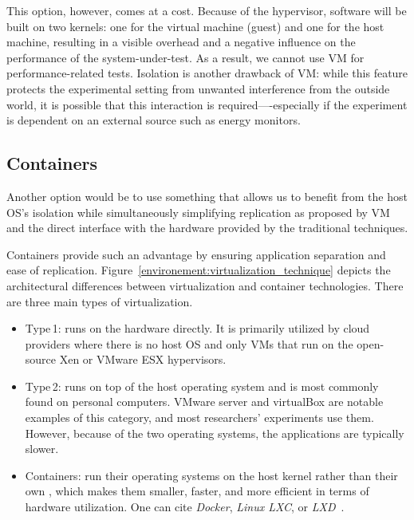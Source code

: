 This option, however, comes at a cost. Because of the hypervisor, software will be built on two kernels: one for the virtual machine (guest) and one for the host machine, resulting in a visible overhead and a negative influence on the performance of the system-under-test.
As a result, we cannot use VM for performance-related tests.
Isolation is another drawback of VM: while this feature protects the experimental setting from unwanted interference from the outside world, it is possible that this interaction is required—-especially if the experiment is dependent on an external source such as energy monitors.

\subsection{Containers}
Another option would be to use something that allows us to benefit from the host OS's isolation while simultaneously simplifying replication as proposed by VM and the direct interface with the hardware provided by the traditional techniques.

Containers provide such an advantage by ensuring application separation and ease of replication.
Figure~\ref{environement:virtualization_technique} depicts the architectural differences between virtualization and container technologies. There are three main types of virtualization.
\begin{itemize}
    \item \textsf{Type\,1}: runs on the hardware directly.
          It is primarily utilized by cloud providers where there is no host OS and only VMs that run on the open-source Xen or VMware ESX hypervisors.

    \item \textsf{Type\,2}: runs on top of the host operating system and is most commonly found on personal computers. VMware server and virtualBox are notable examples of this category, and most researchers' experiments use them.
          However, because of the two operating systems, the applications are typically slower.

    \item \textsf{Containers}: run their operating systems on the host kernel rather than their own , which makes them smaller, faster, and more efficient in terms of hardware utilization. One can cite \emph{Docker}, \emph{Linux LXC}, or \emph{LXD}~\cite{abuabdo_virtualization_2019}.
\end{itemize}


